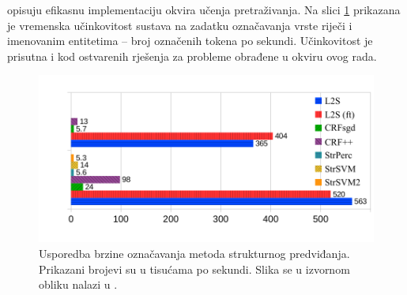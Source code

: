 \citet{daume14lts} opisuju efikasnu implementaciju okvira učenja pretraživanja.
Na slici \ref{fig:ltsperf} prikazana je vremenska učinkovitost sustava na
zadatku označavanja vrste riječi i imenovanim entitetima -- broj označenih
tokena po sekundi. Učinkovitost je prisutna i kod ostvarenih rješenja za
probleme obrađene u okviru ovog rada.

\begin{figure}
  \centering
  \includegraphics[scale=0.9]{tokenposec.pdf}
  \caption[Usporedba brzine označavanja metoda strukturnog
  predviđanja.]{Usporedba brzine označavanja metoda strukturnog predviđanja.
  Prikazani brojevi su u tisućama po sekundi. Slika se u izvornom obliku nalazi
  u \citep{ltsicmltutorial}.}
  \label{fig:ltsperf}
\end{figure}
